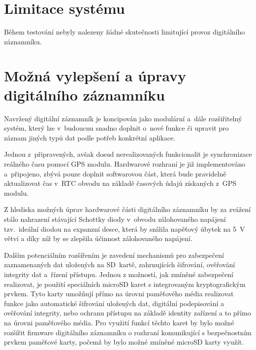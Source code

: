
\section{Limitace systému}
\label{limitace}
Během testování nebyly nalezeny žádné skutečnosti limitující provoz digitálního záznamníku.



\section{Možná vylepšení a úpravy digitálního záznamníku}
\label{mozne_rozsireni}
Navržený digitální záznamník je koncipován jako modulární a~dále rozšiřitelný systém, který lze v~budoucnu snadno doplnit o~nové funkce či upravit pro záznam jiných typů dat podle potřeb konkrétní aplikace.

Jednou z~připravených, avšak dosud nerealizovaných funkcionalit je synchronizace reálného času pomocí GPS modulu. Hardwarové rozhraní je již implementováno a~připojeno, zbývá pouze doplnit softwarovou část, která bude pravidelně aktualizovat čas v~RTC obvodu na základě časových údajů získaných z~GPS modulu.

Z hlediska možných úprav hardwarové části digitálního záznamníku by za zvážení stálo nahrazení stávající Schottky diody v~obvodu zálohovaného napájení tzv.~ideální diodou na expanzní desce, která by snížila napěťový úbytek na \SI{5}{\volt} větvi a díky níž by se zlepšila účinnost zálohovaného napájení.

Dalším potenciálním rozšířením je zavedení mechanismů pro zabezpečení zaznamenaných dat uložených na SD~kartě, zahrnujících šifrování, ověřování integrity dat a~řízení přístupu. Jednou z možností, jak zmíněné zabezpečení realizovat, je použití speciálních microSD karet s integrovaným kryptografickým prvkem. Tyto karty umožňují přímo na úrovni paměťového média realizovat funkce jako automatické šifrování uložených dat, digitální podepisování a ověřování integrity, nebo ochranu přístupu na základě identity zařízení a to přímo na úrovni paměťového média. Pro využití funkcí těchto karet by bylo možné rozšířit firmware digitálního záznamníku o rozhraní komunikující s bezpečnostním prvkem paměťové karty, počemž by bylo možné zmíněné microSD karty využít.

